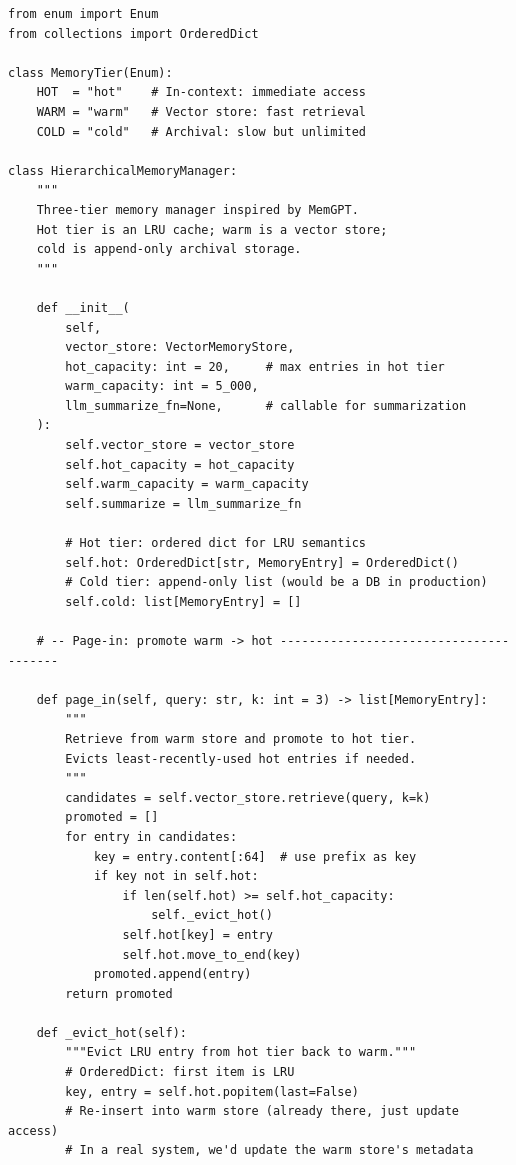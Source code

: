 \begin{lstlisting}[style=pythonstyle, caption={Hierarchical memory manager implementing hot/warm/cold tiers with automatic promotion and demotion.}]
from enum import Enum
from collections import OrderedDict

class MemoryTier(Enum):
    HOT  = "hot"    # In-context: immediate access
    WARM = "warm"   # Vector store: fast retrieval
    COLD = "cold"   # Archival: slow but unlimited

class HierarchicalMemoryManager:
    """
    Three-tier memory manager inspired by MemGPT.
    Hot tier is an LRU cache; warm is a vector store;
    cold is append-only archival storage.
    """

    def __init__(
        self,
        vector_store: VectorMemoryStore,
        hot_capacity: int = 20,     # max entries in hot tier
        warm_capacity: int = 5_000,
        llm_summarize_fn=None,      # callable for summarization
    ):
        self.vector_store = vector_store
        self.hot_capacity = hot_capacity
        self.warm_capacity = warm_capacity
        self.summarize = llm_summarize_fn

        # Hot tier: ordered dict for LRU semantics
        self.hot: OrderedDict[str, MemoryEntry] = OrderedDict()
        # Cold tier: append-only list (would be a DB in production)
        self.cold: list[MemoryEntry] = []

    # -- Page-in: promote warm -> hot ---------------------------------------

    def page_in(self, query: str, k: int = 3) -> list[MemoryEntry]:
        """
        Retrieve from warm store and promote to hot tier.
        Evicts least-recently-used hot entries if needed.
        """
        candidates = self.vector_store.retrieve(query, k=k)
        promoted = []
        for entry in candidates:
            key = entry.content[:64]  # use prefix as key
            if key not in self.hot:
                if len(self.hot) >= self.hot_capacity:
                    self._evict_hot()
                self.hot[key] = entry
                self.hot.move_to_end(key)
            promoted.append(entry)
        return promoted

    def _evict_hot(self):
        """Evict LRU entry from hot tier back to warm."""
        # OrderedDict: first item is LRU
        key, entry = self.hot.popitem(last=False)
        # Re-insert into warm store (already there, just update access)
        # In a real system, we'd update the warm store's metadata


\end{lstlisting}

